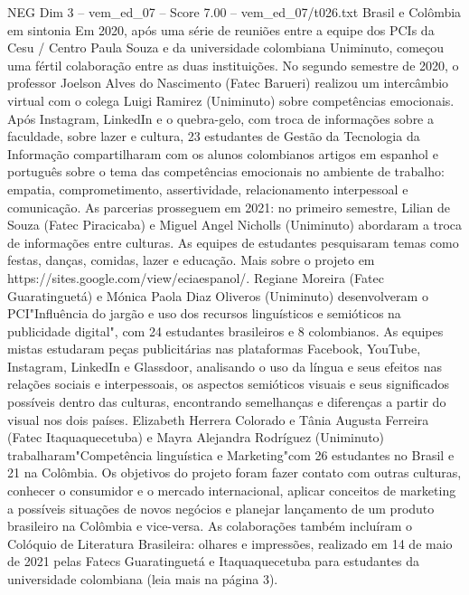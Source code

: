 \begin{textsample}{NEG Dim 3 – vem\_ed\_07 – Score 7.00 – vem\_ed\_07/t026.txt}  \label{ex:f3_neg_109}
Brasil e Colômbia em sintonia Em 2020, após uma série de reuniões entre a equipe dos PCIs da Cesu / Centro Paula Souza e da universidade colombiana Uniminuto, começou uma fértil colaboração entre as duas instituições.
No segundo semestre de 2020, o professor Joelson Alves do Nascimento (Fatec Barueri) realizou um intercâmbio virtual com o colega Luigi Ramirez (Uniminuto) sobre competências emocionais.
Após Instagram, LinkedIn e o quebra-gelo, com troca de informações sobre a faculdade, sobre lazer e cultura, 23 estudantes de Gestão da Tecnologia da Informação compartilharam com os alunos colombianos artigos em espanhol e português sobre o tema das competências emocionais no ambiente de trabalho: empatia, comprometimento, assertividade, relacionamento interpessoal e comunicação.
As parcerias prosseguem em 2021: no primeiro semestre, Lilian de Souza (Fatec Piracicaba) e Miguel Angel Nicholls (Uniminuto) abordaram a troca de informações entre culturas.
As equipes de estudantes pesquisaram temas como festas, danças, comidas, lazer e educação.
Mais sobre o projeto em https://sites.google.com/view/eciaespanol/.
Regiane Moreira (Fatec Guaratinguetá) e Mónica Paola Diaz Oliveros (Uniminuto) desenvolveram o PCI"Influência do jargão e uso dos recursos linguísticos e semióticos na publicidade digital", com 24 estudantes brasileiros e 8 colombianos.
As equipes mistas estudaram peças publicitárias nas plataformas Facebook, YouTube, Instagram, LinkedIn e Glassdoor, analisando o uso da língua e seus efeitos nas relações sociais e interpessoais, os aspectos semióticos visuais e seus significados possíveis dentro das culturas, encontrando semelhanças e diferenças a partir do visual nos dois países.
Elizabeth Herrera Colorado e Tânia Augusta Ferreira (Fatec Itaquaquecetuba) e Mayra Alejandra Rodríguez (Uniminuto) trabalharam"Competência linguística e Marketing"com 26 estudantes no Brasil e 21 na Colômbia.
Os objetivos do projeto foram fazer contato com outras culturas, conhecer o consumidor e o mercado internacional, aplicar conceitos de marketing a possíveis situações de novos negócios e planejar lançamento de um produto brasileiro na Colômbia e vice-versa.
As colaborações também incluíram o Colóquio de Literatura Brasileira: olhares e impressões, realizado em 14 de maio de 2021 pelas Fatecs Guaratinguetá e Itaquaquecetuba para estudantes da universidade colombiana (leia mais na página 3).

\end{textsample}
